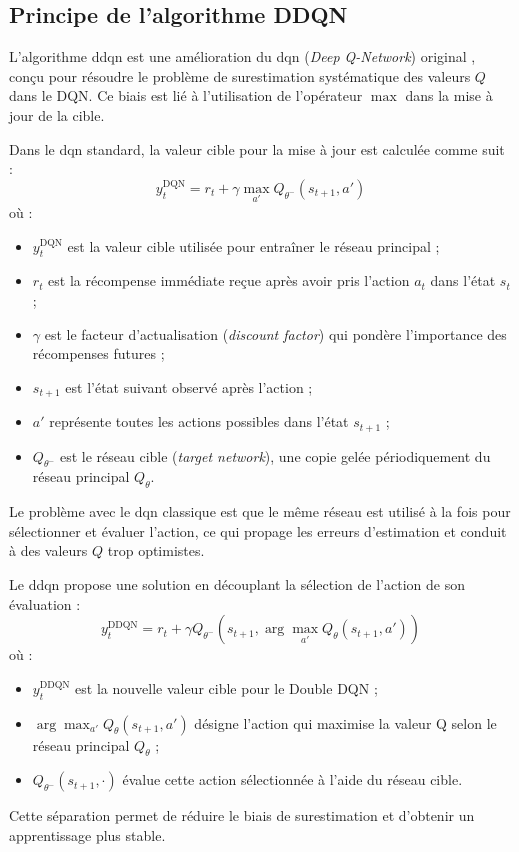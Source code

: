 \subsection{Principe de l'algorithme DDQN}
\label{subsec:principe-ddqn}

L'algorithme \gls{ddqn} est une amélioration du \gls{dqn} (\textit{Deep Q-Network}) original \cite{mnih2015dqn,vanhasselt2016ddqn}, conçu pour résoudre le problème de surestimation systématique des valeurs $Q$ dans le DQN. Ce biais est lié à l'utilisation de l'opérateur \textit{$\max$} dans la mise à jour de la cible.

Dans le \gls{dqn} standard, la valeur cible pour la mise à jour est calculée comme suit :
\begin{equation}
	y_t^{\text{DQN}} = r_t + \gamma \max_{a'} Q_{\theta^-}(s_{t+1}, a')
\end{equation}
où :
\begin{itemize}
	\item $y_t^{\text{DQN}}$ est la valeur cible utilisée pour entraîner le réseau principal ;
	\item $r_t$ est la récompense immédiate reçue après avoir pris l'action $a_t$ dans l'état $s_t$ ;
	\item $\gamma$ est le facteur d'actualisation (\textit{discount factor}) qui pondère l'importance des récompenses futures ;
	\item $s_{t+1}$ est l'état suivant observé après l'action ;
	\item $a'$ représente toutes les actions possibles dans l'état $s_{t+1}$ ;
	\item $Q_{\theta^-}$ est le réseau cible (\textit{target network}), une copie gelée périodiquement du réseau principal $Q_\theta$.
\end{itemize}
Le problème avec le \gls{dqn} classique est que le même réseau est utilisé à la fois pour sélectionner et évaluer l'action, ce qui propage les erreurs d'estimation et conduit à des valeurs $Q$ trop optimistes.

Le \gls{ddqn} propose une solution en découplant la sélection de l'action de son évaluation :
\begin{equation}
	y_t^{\text{DDQN}} = r_t + \gamma Q_{\theta^-}\left(s_{t+1}, \arg\max_{a'} Q_\theta(s_{t+1}, a')\right)
\end{equation}
où :
\begin{itemize}
	\item $y_t^{\text{DDQN}}$ est la nouvelle valeur cible pour le Double DQN ;
	\item $\arg\max_{a'} Q_\theta(s_{t+1}, a')$ désigne l'action qui maximise la valeur Q selon le réseau principal $Q_\theta$ ;
	\item $Q_{\theta^-}(s_{t+1}, \cdot)$ évalue cette action sélectionnée à l'aide du réseau cible.
\end{itemize}
Cette séparation permet de réduire le biais de surestimation et d'obtenir un apprentissage plus stable.

